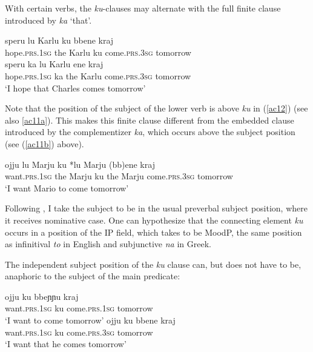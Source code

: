 \documentclass[output=paper]{langscibook}
\begin{document}
With certain verbs, the \textit{ku}-clauses may alternate with the full finite clause introduced by \textit{ka} ‘that’.

\ea\label{ac11}
    \ea \label{ac11a}\gll speru   lu  Karlu   ku  bbene      kraj \\
       hope.\textsc{prs}.\textsc{1sg}    the  Karlu   ku  come.\textsc{prs}.\textsc{3sg}  tomorrow\\
    \ex \label{ac11b}\gll speru       ka   lu  Karlu ene       kraj \\
     hope.\textsc{prs}.\textsc{1sg}    ka   the  Karlu  come.\textsc{prs}.\textsc{3sg}  tomorrow\\
   \glt ‘I hope that Charles comes tomorrow’
    \z
\z

Note that the position of the subject of the lower verb is above \textit{ku} in (\ref{ac12}) (see also \ref{ac11a}). This makes this finite clause different from the embedded clause introduced by the complementizer \textit{ka}, which occurs above the subject position (see (\ref{ac11b}) above).

\ea\label{ac12}
\gll ojju   {lu Marju} ku {*lu Marju} (bb)ene  kraj \\
 want.\textsc{prs}.\textsc{1sg} {the Marju} ku {the Marju}  come.\textsc{prs}.\textsc{3sg} tomorrow\\
\glt ‘I want Mario to come tomorrow’
\z

Following \citet[36]{calabrese1993a}, I take the subject to be in the usual preverbal subject position, where it receives nominative case.  One can hypothesize that the connecting element \textit{ku} occurs in a position of the IP field, which \citet{roberts2003a} takes to be MoodP, the same position as infinitival \textit{to} in English and subjunctive \textit{na} in Greek.

The independent subject position of the \textit{ku} clause can, but does not have to be, anaphoric to the subject of the main predicate:

\ea \label{ac13}
    \ea \label{ac13a}
        \gll ojju          ku   bbeɲɲu      kraj\\
   want.\textsc{prs}.\textsc{1sg}   ku    come.\textsc{prs}.\textsc{1sg}  tomorrow\\
    \glt   ‘I want to come tomorrow'
    \ex \label{ac13b}
        \gll ojju          ku   bbene       kraj \\
   want.\textsc{prs}.\textsc{1sg}   ku   come.\textsc{prs}.\textsc{3sg}  tomorrow\\
    \glt ‘I want that he comes tomorrow’
    \z
\z
\end{document}
